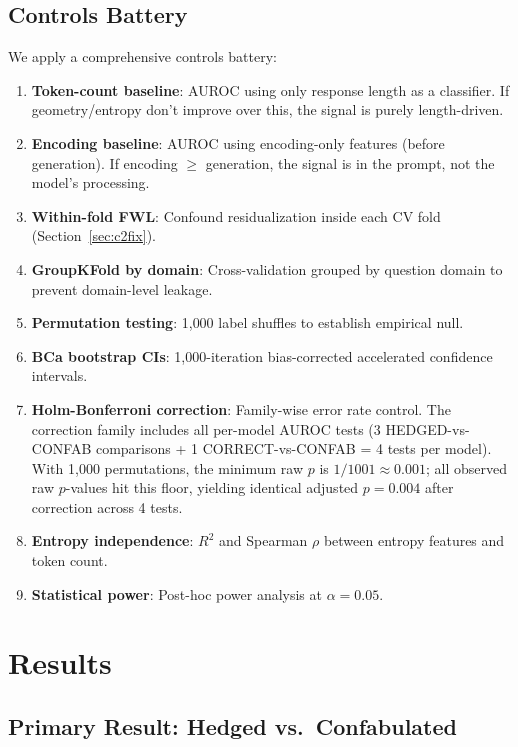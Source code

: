 \documentclass[11pt,a4paper]{article}
\begin{document}
\subsection{Controls Battery}

We apply a comprehensive controls battery:

\begin{enumerate}[nosep]
    \item \textbf{Token-count baseline}: AUROC using only response length as a classifier. If geometry/entropy don't improve over this, the signal is purely length-driven.
    \item \textbf{Encoding baseline}: AUROC using encoding-only features (before generation). If encoding $\geq$ generation, the signal is in the prompt, not the model's processing.
    \item \textbf{Within-fold FWL}: Confound residualization inside each CV fold (Section~\ref{sec:c2fix}).
    \item \textbf{GroupKFold by domain}: Cross-validation grouped by question domain to prevent domain-level leakage.
    \item \textbf{Permutation testing}: 1{,}000 label shuffles to establish empirical null.
    \item \textbf{BCa bootstrap CIs}: 1{,}000-iteration bias-corrected accelerated confidence intervals.
    \item \textbf{Holm-Bonferroni correction}: Family-wise error rate control. The correction family includes all per-model AUROC tests (3 HEDGED-vs-CONFAB comparisons + 1 CORRECT-vs-CONFAB = 4 tests per model). With 1{,}000 permutations, the minimum raw $p$ is $1/1001 \approx 0.001$; all observed raw $p$-values hit this floor, yielding identical adjusted $p = 0.004$ after correction across 4 tests.
    \item \textbf{Entropy independence}: $R^2$ and Spearman $\rho$ between entropy features and token count.
    \item \textbf{Statistical power}: Post-hoc power analysis at $\alpha = 0.05$.
\end{enumerate}

\section{Results}
\label{sec:results}

\subsection{Primary Result: Hedged vs.\ Confabulated}
\end{document}
